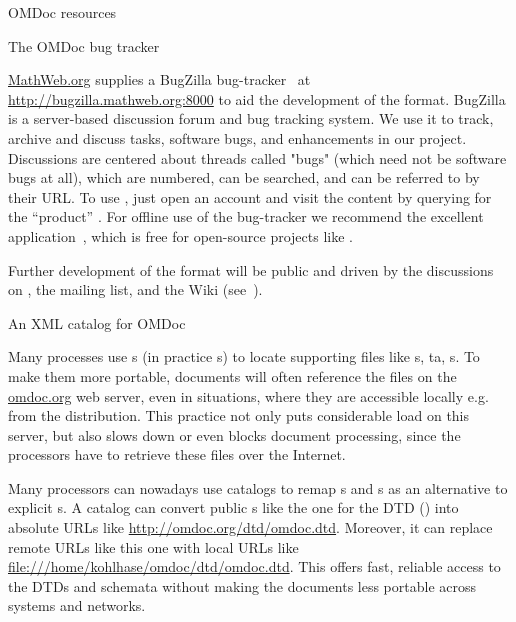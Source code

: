 \begin{tchapter}[id=resources]{OMDoc resources}
\begin{tsection}[id=bugzilla]{The OMDoc bug tracker}

  \url{MathWeb.org} supplies a BugZilla bug-tracker~\cite{bugzilla:URL} at
  \url{http://bugzilla.mathweb.org:8000} to aid the development of the {\omdoc}
  format. BugZilla is a server-based discussion forum and bug tracking system. We use it
  to track, archive and discuss tasks, software bugs, and enhancements in our
  project. Discussions are centered about threads called "bugs" (which need not be
  software bugs at all), which are numbered, can be searched, and can be referred to by
  their URL. To use {\bugzilla}, just open an account and visit the {\omdoc} content by
  querying for the ``product'' {\omdoc}. For offline use of the bug-tracker we recommend
  the excellent {} application~\cite{deskzilla:URL}, which is free for
  open-source projects like {\omdoc}.

  Further development of the {\omdoc} format will be public and driven by the discussions
  on {\bugzilla}, the {\omdoc} mailing list, and the {\omdoc} Wiki
  (see~).
\end{tsection}

\begin{tsection}[id=catalog]{An XML catalog for OMDoc}
  
  Many {\xml} processes use {s} (in practice {s}) to
  locate supporting files like {s}, {ta},
  {s}. To make them more portable, {\omdoc} documents will often
  reference the files on the \url{omdoc.org} web server, even in situations, where
  they are accessible locally e.g. from the {\omdoc} distribution. This practice not only
  puts considerable load on this server, but also slows down or even blocks document
  processing, since the {\xml} processors have to retrieve these files over the Internet.

  Many processors can nowadays use {\xml} catalogs to remap
  {s} and {s} as an alternative to explicit
  {s}. A catalog can convert public {}s like the
  one for the {\omdoc} DTD ({}) into absolute URLs
  like \url{http://omdoc.org/dtd/omdoc.dtd}. Moreover, it can replace remote
  URLs like this one with local URLs like
  \url{file:///home/kohlhase/omdoc/dtd/omdoc.dtd}.  This offers fast, reliable access to
  the DTDs and schemata without making the documents less portable across systems and
  networks.


\end{tsection}
\end{tchapter}
